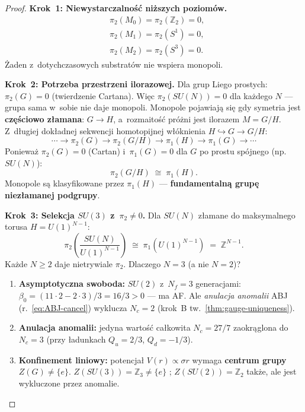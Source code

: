 \begin{proof}
\textbf{Krok~1: Niewystarczalno\'s\'c ni\.zszych poziom\'ow.}
\begin{align}
  &\pi_2(M_0) = \pi_2(\mathbb{Z}_2) = 0, \label{eq:D2-pi2-check0} \\
  &\pi_2(M_1) = \pi_2(S^1) = 0, \label{eq:D2-pi2-check1} \\
  &\pi_2(M_2) = \pi_2(S^3) = 0. \label{eq:D2-pi2-check2}
\end{align}
\.Zaden z~dotychczasowych substrat\'ow nie wspiera monopoli.

\textbf{Krok~2: Potrzeba przestrzeni ilorazowej.}
Dla grup Liego prostych: $\pi_2(G) = 0$ (twierdzenie Cartana).
Wi\k{e}c $\pi_2(SU(N)) = 0$ dla ka\.zdego $N$ --- grupa sama
w~sobie nie daje monopoli. Monopole pojawiaj\k{a} si\k{e}
gdy symetria jest \textbf{cz\k{e}\'sciowo z\l{}amana}:
$G \to H$, a~rozmaito\'s\'c pr\'o\.zni jest ilorazem
$M = G/H$. Z~d\l{}ugiej dok\l{}adnej sekwencji homotopijnej
w\l{}\'oknienia $H \hookrightarrow G \to G/H$:
\begin{equation}\label{eq:D2-exact-seq}
  \cdots \to \pi_2(G) \to \pi_2(G/H) \to \pi_1(H) \to \pi_1(G) \to \cdots
\end{equation}
Poniewa\.z $\pi_2(G) = 0$ (Cartan) i~$\pi_1(G) = 0$ dla
$G$ po prostu sp\'ojnego (np.~$SU(N)$):
\begin{equation}\label{eq:D2-pi2-coset}
  \boxed{\pi_2(G/H) \;\cong\; \pi_1(H).}
\end{equation}
Monopole s\k{a} klasyfikowane przez $\pi_1(H)$ ---
\textbf{fundamentaln\k{a} grup\k{e} niez\l{}amanej podgrupy}.

\textbf{Krok~3: Selekcja $SU(3)$ z~$\pi_2 \neq 0$.}
Dla $SU(N)$ z\l{}amane do maksymalnego torusa $H = U(1)^{N-1}$:
\begin{equation}\label{eq:D2-pi2-SUN}
  \pi_2\!\left(\frac{SU(N)}{U(1)^{N-1}}\right)
  \;\cong\; \pi_1(U(1)^{N-1})
  \;=\; \mathbb{Z}^{N-1}.
\end{equation}
Ka\.zde $N \geq 2$ daje nietrywiale $\pi_2$.
Dlaczego $N = 3$ (a nie $N = 2$)?

\begin{enumerate}[nosep]
  \item \textbf{Asymptotyczna swoboda:} $SU(2)$ z~$N_f = 3$
    generacjami: $\beta_0 = (11 \cdot 2 - 2 \cdot 3)/3 = 16/3 > 0$
    --- ma AF. Ale \emph{anulacja anomalii} ABJ
    (r.~\eqref{eq:ABJ-cancel}) wyklucza $N_c = 2$
    (krok~B tw.~\ref{thm:gauge-uniqueness}).
  \item \textbf{Anulacja anomalii:} jedyna warto\'s\'c ca\l{}kowita
    $N_c = 27/7$ zaokr\k{a}glona do $N_c = 3$
    (przy \l{}adunkach $Q_u = 2/3$, $Q_d = -1/3$).
  \item \textbf{Konfinement liniowy:} potencja\l{} $V(r) \propto \sigma r$
    wymaga \textbf{centrum grupy} $Z(G) \neq \{e\}$.
    $Z(SU(3)) = \mathbb{Z}_3 \neq \{e\}$ \cmark;
    $Z(SU(2)) = \mathbb{Z}_2$ tak\.ze, ale jest wykluczone przez
    anomalie.
\end{enumerate}


\end{proof}

